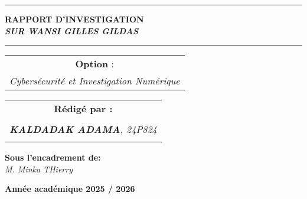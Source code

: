 \documentclass[memoire, 12pt]{report}
\begin{document}
\begin{titlepage}
\begin{center}
		\vspace{0.5cm}
		\begin{tabular}{l*{40}{@{\hskip 3.5cm}c@{\hskip5cm}} p{3.5cm} r}
		\end{tabular}
		
		\noindent\rule{\textwidth}{0.7mm}
		\Large{{\textbf{RAPPORT D'INVESTIGATION}}}\\
		\Large{{\textbf{\textit{SUR WANSI GILLES GILDAS}}}}
		\noindent\rule{\textwidth}{0.7mm}
	\end{center}
		
	\begin{center}
	\begin{tabular}{c}
		
		\vspace{0.1cm}
		\normalsize
	
	
		\vspace{0.1cm}
		\normalsize\textbf{Option }:\\			
		\textsl{Cybersécurité et Investigation Numérique}
		
	\end{tabular}
	\end{center}
		
	\begin{center}
		\normalsize %
		\begin{tabular}{c}
			\vspace{0.07cm}
			\hspace{0.02cm} \textbf{\textbf{Rédigé par :}}\\
			\hspace{0.02cm} \textsl{\textbf{}}\\
            \hspace{0.02cm} \textsl{\textbf{KALDADAK ADAMA}, 24P824}\\\\
			
		\end{tabular}
	\end{center}
	
	\begin{center}
	\hspace{0.02cm} \textbf{Sous l'encadrement de:}\\
	\hspace{0.02cm} \textsl{M. Minka THierry}
	\end{center}
	
    
	\vspace{4cm}
	\begin{center}
		\textbf{Année académique 2025 / 2026}
	\end{center}
		
	\vspace{-1.4cm}
	
		
	\vfill%
	
\end{titlepage}
\tableofcontents
\newpage
\end{document}
